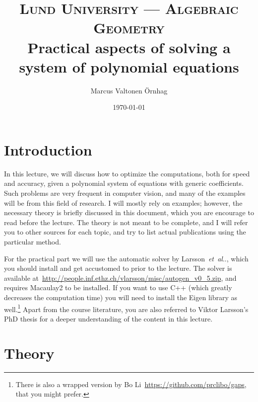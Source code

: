 \documentclass[11pt,a4paper]{article}
\title{
\normalfont \normalsize
\textsc{Lund University --- Algebraic Geometry} \\ [7pt]
\Large Practical aspects of solving a system of polynomial equations \\
}
\author{Marcus Valtonen \"{O}rnhag} %
\date{\normalsize\today} %
\makeatletter
\theoremstyle{definition}
\DeclareRobustCommand\etal{\emph{et~al}\@ifnextchar.{}{.\@}}
\makeatother
\begin{document}
\maketitle %

\section{Introduction}
In this lecture, we will discuss how to optimize the computations, both for speed and
accuracy, given a polynomial system of equations with generic coefficients. Such problems are very
frequent in computer vision, and many of the examples will be from this field of research.
I will mostly rely on examples; however,
the necessary theory is briefly discussed in this document, which you are encourage to read before
the lecture. The theory is not meant to be complete, and I will refer you to other sources for
each topic, and try to list actual publications using the particular method.

For the practical part we will use the
automatic solver by Larsson~\etal{}, which you should install and get accustomed to prior
to the lecture. The solver is available at~\url{http://people.inf.ethz.ch/vlarsson/misc/autogen_v0_5.zip}, and requires Macaulay2 to be installed. If you want to use C++ (which greatly decreases the computation time) you will need to install the Eigen library as well.\footnote{There is also a wrapped version by Bo Li~\url{https://github.com/prclibo/gaps}, that you might prefer.}
Apart from the course literature, you are also referred to Viktor Larsson's PhD
thesis for a deeper understanding of the content in this lecture.

\section{Theory}
\end{document}
